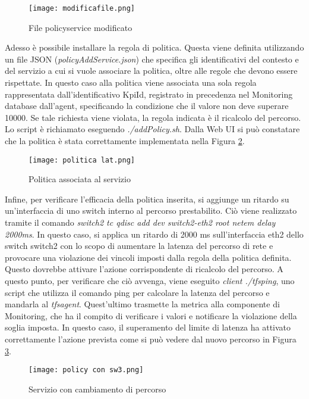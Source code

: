 \begin{figure}[h]
    \centering
    \texttt{[image: modificafile.png]}
    \caption{File policyservice modificato}
    \label{fig:pol}
\end{figure}
Adesso è possibile installare la regola di politica.
Questa viene definita utilizzando un file JSON (\textit{policyAddService.json}) che specifica gli identificativi 
del contesto e del servizio a cui si vuole associare la politica, oltre alle regole che devono essere rispettate. 
In questo caso 
alla politica viene associata una sola regola rappresentata dall'identificativo KpiId, registrato in precedenza nel Monitoring database dall'agent, 
specificando la condizione che il valore non deve superare 10000.
Se tale richiesta viene violata, la regola indicata è il ricalcolo del percorso.
Lo script è richiamato eseguendo \textit{./addPolicy.sh}.
Dalla Web UI si può constatare che la politica è stata correttamente implementata nella Figura \ref{fig:lat}.
\begin{figure}[h]
    \centering
    \texttt{[image: politica lat.png]}
    \caption{Politica associata al servizio}
    \label{fig:lat}
\end{figure}
Infine, per verificare l'efficacia della politica inserita, si aggiunge un ritardo su un'interfaccia di uno switch interno al percorso prestabilito.
Ciò viene realizzato tramite il comando
\textit{switch2 tc qdisc add dev switch2-eth2 root netem delay 2000ms}. 
In questo caso, si applica un ritardo di 2000 ms sull'interfaccia eth2 dello switch switch2 con lo scopo di aumentare la latenza del percorso di rete
e provocare una violazione dei vincoli imposti dalla regola della politica definita.
Questo dovrebbe attivare l'azione corrispondente di ricalcolo del percorso.
A questo punto, per verificare che ciò avvenga, viene eseguito \textit{client ./tfsping}, uno script che utilizza il comando ping per calcolare la latenza del percorso e mandarla al \textit{tfsagent}.
Quest'ultimo trasmette la metrica alla componente di Monitoring, che ha il compito di verificare i valori e notificare la violazione della soglia imposta. 
In questo caso, il superamento del limite di latenza ha attivato correttamente l'azione prevista come si può vedere dal nuovo percorso in Figura \ref{fig:sw4 dopo}.
\begin{figure}[h]
    \centering
    \texttt{[image: policy con sw3.png]}
    \caption{Servizio con cambiamento di percorso}
    \label{fig:sw4 dopo}
\end{figure}
